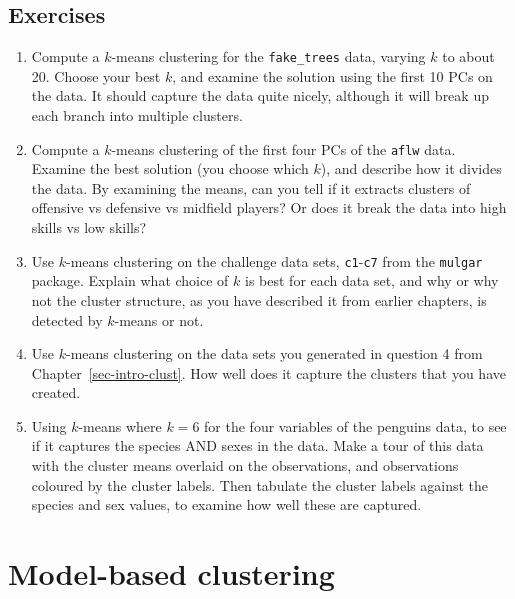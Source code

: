 \documentclass[
  letterpaper,
]{krantz}
\providecommand{\tightlist}{%
  \setlength{\itemsep}{0pt}\setlength{\parskip}{0pt}}
\begin{document}
\section*{Exercises}\label{exercises-8}


\begin{enumerate}
\def\labelenumi{\arabic{enumi}.}
\tightlist
\item
  Compute a \(k\)-means clustering for the \texttt{fake\_trees} data,
  varying \(k\) to about 20. Choose your best \(k\), and examine the
  solution using the first 10 PCs on the data. It should capture the
  data quite nicely, although it will break up each branch into multiple
  clusters.
\item
  Compute a \(k\)-means clustering of the first four PCs of the
  \texttt{aflw} data. Examine the best solution (you choose which
  \(k\)), and describe how it divides the data. By examining the means,
  can you tell if it extracts clusters of offensive vs defensive vs
  midfield players? Or does it break the data into high skills vs low
  skills?
\item
  Use \(k\)-means clustering on the challenge data sets,
  \texttt{c1}-\texttt{c7} from the \texttt{mulgar} package. Explain what
  choice of \(k\) is best for each data set, and why or why not the
  cluster structure, as you have described it from earlier chapters, is
  detected by \(k\)-means or not.
\item
  Use \(k\)-means clustering on the data sets you generated in question
  4 from Chapter~\ref{sec-intro-clust}. How well does it capture the
  clusters that you have created.
\item
  Using \(k\)-means where \(k=6\) for the four variables of the penguins
  data, to see if it captures the species AND sexes in the data. Make a
  tour of this data with the cluster means overlaid on the observations,
  and observations coloured by the cluster labels. Then tabulate the
  cluster labels against the species and sex values, to examine how well
  these are captured.
\end{enumerate}

\chapter{Model-based clustering}\label{sec-mclust}

\end{document}
